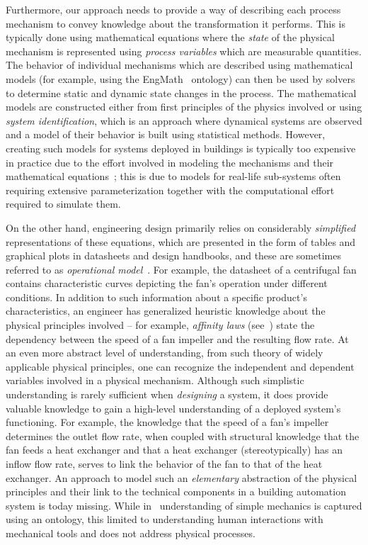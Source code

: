 \documentclass[sigconf]{acmart}
\begin{document}
Furthermore, our approach needs to provide a way of describing each process mechanism to convey knowledge about the transformation it performs. This is typically done using mathematical equations where the \emph{state} of the physical mechanism is represented using \textit{process variables} which are measurable quantities.
The behavior of individual mechanisms which are described using mathematical models (for example, using the EngMath~\cite{gruber1994ontology} ontology) can then be used by solvers to determine static and dynamic state changes in the process.
The mathematical models are constructed either from first principles of the physics involved or using \textit{system identification}, which is an approach where dynamical systems are observed and a model of their behavior is built using statistical methods.
However, creating such models for systems deployed in buildings is typically too expensive in practice due to the effort involved in modeling the mechanisms and their mathematical equations~\cite{wetter2019view}; this is due to models for real-life sub-systems often requiring extensive parameterization together with the computational effort required to simulate them.

On the other hand, engineering design primarily relies on considerably \emph{simplified} representations of these equations, which are presented in the form of tables and graphical plots in datasheets and design handbooks, and these are sometimes referred to as \textit{operational model}~\cite{pp_kief_yoshioka2004physical}.
For example, the datasheet of a centrifugal fan contains characteristic curves depicting the fan's operation under different conditions.
In addition to such information about a specific product's characteristics, an engineer has generalized heuristic knowledge about the physical principles involved -- for example, \textit{affinity laws} (see~\cite{stewart2018surface}) state the dependency between the speed of a fan impeller and the resulting flow rate.
At an even more abstract level of understanding, from such theory of widely applicable physical principles, one can recognize the independent and dependent variables involved in a physical mechanism.
Although such simplistic understanding is rarely sufficient when \emph{designing} a system, it does provide valuable knowledge to gain a high-level understanding of a deployed system's functioning.
For example, the knowledge that the speed of a fan's impeller determines the outlet flow rate, when coupled with structural knowledge that the fan feeds a heat exchanger and that a heat exchanger (stereotypically) has an inflow flow rate, serves to link the behavior of the fan to that of the heat exchanger.
An approach to model such an \textit{elementary} abstraction of the physical principles and their link to the technical components in a building automation system is today missing.
While in~\cite{hodges1995functional} understanding of simple mechanics is captured using an ontology, this limited to understanding human interactions with mechanical tools and does not address physical processes.
\end{document}
